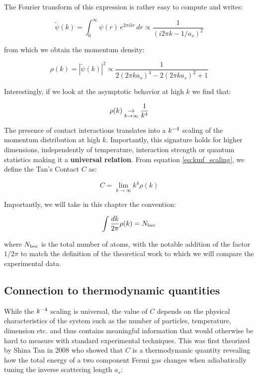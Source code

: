 \noindent The Fourier transform of this expression is rather easy to compute and writes:

\begin{equation}
    \tilde{\psi}(k) = \int_0^\infty \psi(r) \, e^{2 \pi i k r} \, dr \propto \frac{1}{(i 2 \pi k - 1/a_s)^2}
\end{equation}

\noindent from which we obtain the momentum density:

\begin{equation}
     \rho(k) = |\tilde{\psi}(k) |^2 \propto \frac{1}{2(2 \pi k a_s)^4 - 2(2 \pi k a_s)^2 +1}
\end{equation}

\noindent Interestingly, if we look at the asymptotic behavior at high $k$ we find that:

\begin{equation}
    \rho(k) \underrel{k \to \infty} \to \frac{1}{k^4}
    \label{eq:kmf_scaling}
\end{equation}

\noindent The presence of contact interactions translates into a $k^{-4}$ scaling of the momentum distribution at high $k$. Importantly, this signature holds for higher dimensions, independently of temperature, interaction strength or quantum statistics making it a \textbf{universal relation}. From equation \ref{eq:kmf_scaling}, we define the Tan's Contact $C$ as:

\begin{equation}
    C = \lim_{k \to \infty} k^4 \rho(k)
\end{equation}

Importantly, we will take in this chapter the convention:

\begin{equation}
    \int \frac{d k}{2 \pi} \rho(k)= N_{\rm{bec}}
\end{equation}

\noindent where $N_{\rm{bec}}$ is the total number of atoms, with the notable addition of the factor $1/2 \pi$ to match the definition of the theoretical work \cite{yao2018tan} to which we will compare the experimental data.  

\subsection{Connection to thermodynamic quantities}

While the $k^{-4}$ scaling is universal, the value of $C$ depends on the physical characteristics of the system such as the number of particles, temperature, dimension etc. and thus contains meaningful information that would otherwise be hard to measure with standard experimental techniques. This was first theorized by Shina Tan in 2008 \cite{tan2008large} who showed that $C$ is a thermodynamic quantity revealing how the total energy of a two component Fermi gas changes when adiabatically tuning the inverse scattering length $a_s$:


